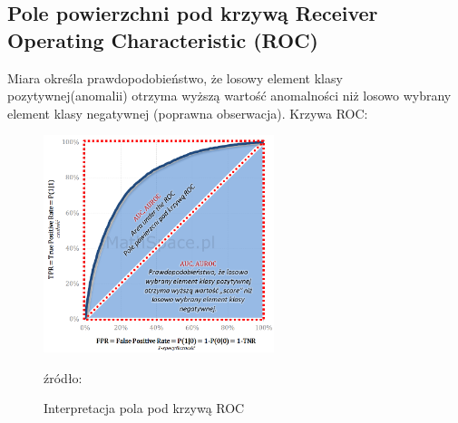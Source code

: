 \subsection{Pole powierzchni pod krzywą Receiver Operating Characteristic (ROC)}
    Miara określa prawdopodobieństwo, że losowy element klasy pozytywnej(anomalii) otrzyma wyższą wartość anomalności niż losowo wybrany element klasy negatywnej (poprawna obserwacja). Krzywa ROC:
    \begin{figure}[!h]
        \centering
        \includegraphics[width = 0.6\textwidth]{chapters/analiza/img/ROC-interpr-AUROC.png}
        \caption{Interpretacja pola pod krzywą ROC}
        \footnotesize{źródło: \cite{roc-image} }
        \label{fig:my_label}
    \end{figure}

